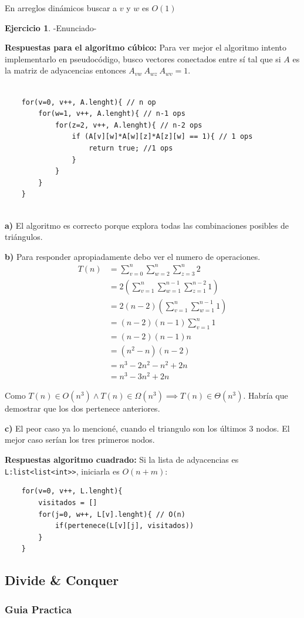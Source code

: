 \documentclass[12pt]{article}
\theoremstyle{definition}
\newtheorem{ejercicio}{Ejercicio}
\begin{document}
En arreglos dinámicos buscar a $v$ y $w$ es $O(1)$

\begin{ejercicio}
    -Enunciado-
\end{ejercicio}
\textbf{Respuestas para el algoritmo cúbico:}
Para ver mejor el algoritmo intento implementarlo en pseudocódigo, busco vectores conectados
entre sí tal que si $A$ es la matriz de adyacencias entonces $A_{vw} \ A_{wz} \ A_{wv} = 1$.
\begin{verbatim}
    
    for(v=0, v++, A.lenght){ // n op
        for(w=1, v++, A.lenght){ // n-1 ops
            for(z=2, v++, A.lenght){ // n-2 ops
                if (A[v][w]*A[w][z]*A[z][w] == 1){ // 1 ops
                    return true; //1 ops
                }
            }
        }
    }
    
\end{verbatim}

\textbf{a)} El algoritmo es correcto porque explora todas las combinaciones posibles de triángulos.

\textbf{b)} Para responder apropiadamente debo ver el numero de operaciones.
\begin{align*}
    T(n) &=  \sum_{v=0}^{n} \sum_{w=2}^{n} \sum_{z=3}^{n} 2 \\
    &= 2(\sum_{v=1}^{n} \sum_{w=1}^{n-1} \sum_{z=1}^{n-2} 1) \\
    &= 2 (n-2) (\sum_{v=1}^{n} \sum_{w=1}^{n-1}1) \\
    &= (n-2) (n-1)\sum_{v=1}^{n} 1 \\
    &= (n-2) (n-1) n \\
    &= (n^2-n)(n-2) \\
    &= n^3-2n^2-n^2+2n \\
    &= n^3 - 3n^2 + 2n
\end{align*}

Como $T(n) \in O(n^3) \land T(n) \in \Omega(n^3) \implies T(n) \in \Theta(n^3)$. Habría que demostrar que
los dos pertenece anteriores.

\textbf{c)} El peor caso ya lo mencioné, cuando el triangulo son los últimos 3 nodos. El mejor caso serían
los tres primeros nodos.

\textbf{Respuestas algoritmo cuadrado:}
Si la lista de adyacencias es \lstinline|L:list<list<int>>|, iniciarla es $O(n+m)$:
\begin{verbatim}
    for(v=0, v++, L.lenght){ 
        visitados = []
        for(j=0, w++, L[v].lenght){ // O(n)
            if(pertenece(L[v][j], visitados))
        }
    }
\end{verbatim}

\subsection{Divide \& Conquer}
\subsubsection{Guia Practica}
\end{document}
